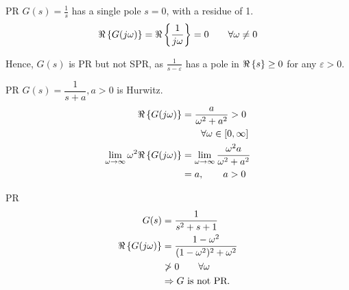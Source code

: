 \begin{example}{PR}
$G(s) = \frac{1}{s}$ has a single pole $s = 0$,
with a residue of 1.
\begin{alignat*}{3}
\Re\left\{G(j\omega)\right\} = \Re\left\{ \frac{1}{j\omega}\right\} = 0 \qquad \forall \omega \neq 0
\end{alignat*}

Hence, $G(s)$ is PR but not SPR,
as $ \frac{1}{s - \varepsilon}$ has a pole
in $\Re\left\{s\right\} \geq 0$ for any
$\varepsilon > 0$. 
\end{example}

\begin{example}{PR}
$G(s) = \dfrac{1}{s + a}, a>0$ is Hurwitz.
\begin{alignat*}{3}
\Re\left\{G(j\omega)\right\} &= \dfrac{a}{\omega^2 + a^2} > 0 \\
    & \qquad
    \forall \omega \in [0, \infty]\\
\lim_{\omega \rightarrow \infty} \omega^2 \Re\left\{G(j\omega)\right\}
    &= \lim_{\omega \rightarrow \infty} \dfrac{\omega^2a}{\omega^2 + a^2}\\
    &= a, \qquad a > 0
\end{alignat*}
\end{example}

\begin{example}{PR}
\begin{alignat*}{3}
G(s) &= \dfrac{1}{s^2 + s + 1}\\
\Re\left\{G(j\omega)\right\} &= \dfrac{1 - \omega^2}{(1 - \omega^2)^2 + \omega^2}\\
    &\ngtr 0 \qquad \forall \omega\\
    &\Rightarrow G \textnormal{ is not PR.}
\end{alignat*}
\end{example}


